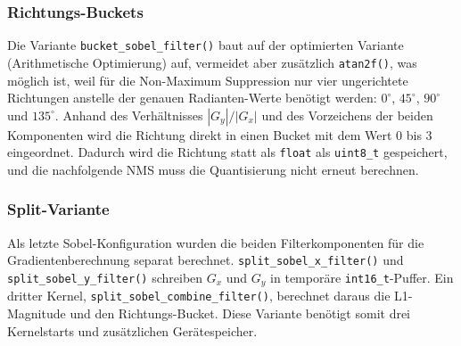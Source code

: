 \subsubsection{Richtungs-Buckets}

Die Variante \texttt{bucket\_sobel\_filter()} baut auf der optimierten Variante (Arithmetische Optimierung) auf, vermeidet aber zusätzlich \texttt{atan2f()}, was möglich ist, weil für die
Non-Maximum Suppression nur vier ungerichtete Richtungen anstelle der genauen Radianten-Werte benötigt werden:
$0^\circ$, $45^\circ$, $90^\circ$ und $135^\circ$. Anhand des Verhältnisses
$|G_y|/|G_x|$ und des Vorzeichens der beiden Komponenten wird die Richtung
direkt in einen Bucket mit dem Wert $0$ bis $3$ eingeordnet. Dadurch
wird die Richtung statt als \texttt{float} als \texttt{uint8\_t} gespeichert,
und die nachfolgende NMS muss die Quantisierung nicht erneut berechnen.

\subsubsection{Split-Variante}
Als letzte Sobel-Konfiguration wurden die beiden Filterkomponenten für die Gradientenberechnung separat
berechnet. \texttt{split\_sobel\_x\_filter()} und
\texttt{split\_sobel\_y\_filter()} schreiben $G_x$ und $G_y$ in temporäre
\texttt{int16\_t}-Puffer. Ein dritter Kernel,
\texttt{split\_sobel\_combine\_filter()}, berechnet daraus die L1-Magnitude
und den Richtungs-Bucket. Diese Variante benötigt somit drei Kernelstarts und
zusätzlichen Gerätespeicher.